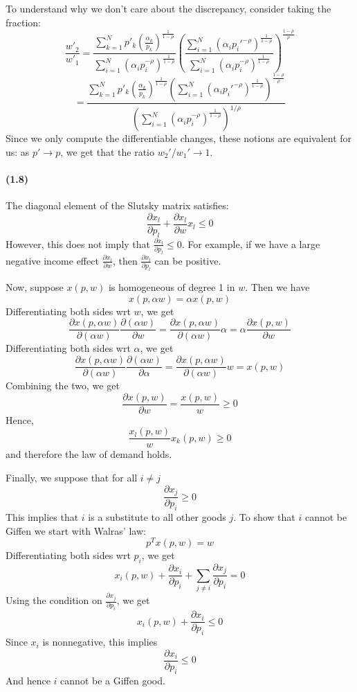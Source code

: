 \documentclass[10pt,letter]{article}
\begin{document}
To understand why we don't care about the discrepancy, consider taking the fraction:
\[ \frac{w'_2}{w'_1} = \frac{\sum_{k=1}^N p'_k \left(\frac{\alpha_k}{p_k}\right)^{\frac{1}{1-\rho}}}{\sum_{i=1}^N \left(\alpha_i p_i^{-\rho }\right)^{\frac{1}{1-\rho}} }\left( \frac{\sum_{i=1}^N \left(\alpha_i p_i'^{-\rho }\right)^{\frac{1}{1-\rho}}}{\sum_{i=1}^N \left(\alpha_i p_i^{-\rho }\right)^{\frac{1}{1-\rho}}} \right)^{\frac{1-\rho}{\rho}} \]
\[ = \frac{\sum_{k=1}^N p'_k \left(\frac{\alpha_k}{p_k}\right)^{\frac{1}{1-\rho}}\left( \sum_{i=1}^N \left(\alpha_i p_i'^{-\rho }\right)^{\frac{1}{1-\rho}}\right)^{\frac{1-\rho}{\rho}}}{\left(\sum_{i=1}^N \left(\alpha_i p_i^{-\rho }\right)^{\frac{1}{1-\rho}} \right)^{1/\rho}} \]
Since we only compute the differentiable changes, these notions are equivalent for us: as $p' \to p$, we get that the ratio $w_2' / w_1' \to 1$.
\paragraph{(1.8)}
The diagonal element of the Slutsky matrix satisfies:
\[ \frac{\partial x_l}{\partial p_l} + \frac{\partial x_l}{\partial w} x_l \le 0 \]
However, this does not imply that $\frac{\partial x_l}{\partial p_l}  \le 0$. For example, if we have a large negative income effect $\frac{\partial x_l}{\partial w}$, then $\frac{\partial x_l}{\partial p_l}$ can be positive.

Now, suppose $x(p,w)$ is homogeneous of degree 1 in $w$. Then we have
\[ x(p, \alpha w) = \alpha x(p, w) \]
Differentiating both sides wrt $w$, we get
\[ \frac{\partial x(p, \alpha w)}{\partial (\alpha w)}\frac{\partial (\alpha w)}{\partial w} = \frac{\partial x(p, \alpha w)}{\partial (\alpha w)}\alpha = \alpha \frac{\partial x(p, w)}{\partial w} \]
Differentiating both sides wrt $\alpha$, we get
\[ \frac{\partial x(p, \alpha w)}{\partial (\alpha w)}\frac{\partial (\alpha w)}{\partial \alpha} = \frac{\partial x(p, \alpha w)}{\partial (\alpha w)}w = x(p, w) \]
Combining the two, we get
\[ \frac{\partial x(p,w)}{\partial w} = \frac{x(p,w)}{w} \ge 0 \]
Hence,
\[\frac{x_l(p,w)}{w} x_k(p,w) \ge 0 \]
and therefore the law of demand holds.

Finally, we suppose that for all $i \neq j$
\[ \frac{\partial x_j}{\partial p_i} \ge 0 \]
This implies that $i$ is a substitute to all other goods $j$. To show that $i$ cannot be Giffen we start with Walras' law:
\[ p^T x( p,  w) = w\]
Differentiating both sides wrt $p_i$, we get
\[ x_i(p,w) + \frac{\partial x_i}{\partial p_i} + \sum_{j \neq i} \frac{\partial x_j}{\partial p_i} = 0 \]
Using the condition on $\frac{\partial x_j}{\partial p_i}$, we get
\[ x_i(p,w) + \frac{\partial x_i}{\partial p_i} \le 0 \]
Since $x_i$ is nonnegative, this implies
\[\frac{\partial x_i}{\partial p_i} \le 0 \]
And hence $i$ cannot be a Giffen good.
\end{document}
